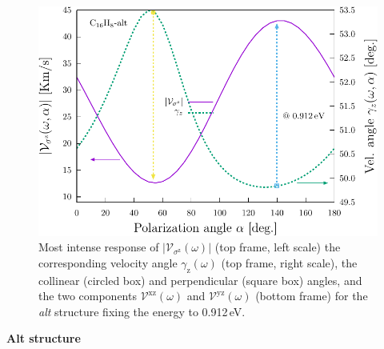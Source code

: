 \documentclass[prb,11pt,tightenlines,twocolumn,aps]{revtex4-1}
\begin{document}
\begin{figure}[t]
    \centering
    \includegraphics[width=\linewidth]{altplots/alt-vaz-rag}
    \caption{Most intense response of
    $|\mathcal{V}_{\sigma^{\mathrm{z}}}(\omega)|$ (top frame, left scale) the
    corresponding velocity angle $\gamma_{\mathrm{z}}(\omega)$ (top frame, right
    scale), the collinear (circled box) and perpendicular (square box) angles,
    and the two components $\mathcal{V}^{\mathrm{xz}}(\omega)$ and
    $\mathcal{V}^{\mathrm{yz}}(\omega)$ (bottom frame) for the \emph{alt}
    structure fixing the energy to 0.912\,eV.}
    \label{fig:alt-vaz-rag}
\end{figure}

\textbf{Alt structure}
\end{document}

